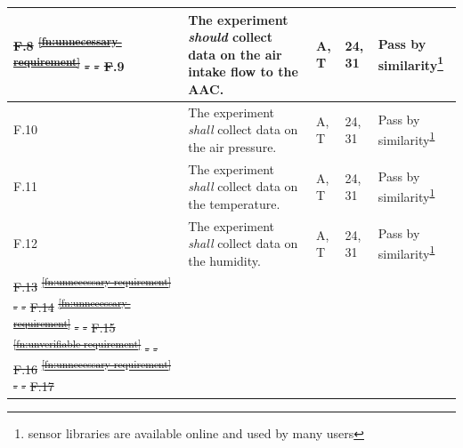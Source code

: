 \documentclass[a4paper,12pt,twoside]{article}
\providecommand{\DIFdeltex}[1]{{\protect\color{red}\sout{#1}}}                      %
\providecommand{\DIFdelbegin}{} %
\providecommand{\DIFdelend}{} %
\providecommand{\DIFdel}[1]{\texorpdfstring{\DIFdeltex{#1}}{}} %
\newcommand{\DIFscaledelfig}{0.5}
\newlength{\DIFdelgraphicswidth} %
\newlength{\DIFdelgraphicsheight} %
\newcommand{\DIFdelincludegraphics}[2][]{%
\sbox{\DIFdelgraphicsbox}{\DIFOincludegraphics[#1]{#2}}%
\settoboxwidth{\DIFdelgraphicswidth}{\DIFdelgraphicsbox} %
\settoboxtotalheight{\DIFdelgraphicsheight}{\DIFdelgraphicsbox} %
\scalebox{\DIFscaledelfig}{%
\parbox[b]{\DIFdelgraphicswidth}{\usebox{\DIFdelgraphicsbox}\\[-\baselineskip] \rule{\DIFdelgraphicswidth}{0em}}\llap{\resizebox{\DIFdelgraphicswidth}{\DIFdelgraphicsheight}{%
\setlength{\unitlength}{\DIFdelgraphicswidth}%
\begin{picture}(1,1)%
\thicklines\linethickness{2pt} %
{\color[rgb]{1,0,0}\put(0,0){\framebox(1,1){}}}%
{\color[rgb]{1,0,0}\put(0,0){\line( 1,1){1}}}%
{\color[rgb]{1,0,0}\put(0,1){\line(1,-1){1}}}%
\end{picture}%
}\hspace*{3pt}}} %
} %
\DeclareRobustCommand{\DIFdelbegin}{\DIFOdelbegin \let\includegraphics\DIFdelincludegraphics} %
\DeclareRobustCommand{\DIFdelend}{\DIFOaddend \let\includegraphics\DIFOincludegraphics} %
\begin{document}
\begin{longtable}[]{|m{}| m{} |m{} |m{}|m{}|}
\DIFdel{F.8  }%
\DIFdel{\textsuperscript{\ref{fn:unnecessary-requirement}}  }%
\DIFdel{- }%
\DIFdel{-}%
\DIFdel{F}\DIFdelend .9  & The experiment \textit{should} collect data on the air intake flow to the AAC. & A, T & 24, 31 & Pass by similarity\footnote{sensor libraries are available online and used by many users\label{fn:sensor-libraries}}\\ \hline
F.10 & The experiment \textit{shall} collect data on the air pressure. & A, T& 24, 31 & Pass by similarity\textsuperscript{\ref{fn:sensor-libraries}}\\ \hline
F.11 & The experiment \textit{shall} collect data on the temperature. &  A, T& 24, 31 & Pass by similarity\textsuperscript{\ref{fn:sensor-libraries}}\\ \hline
F.12 & The experiment \textit{shall} collect data on the humidity. & A, T & 24, 31  & Pass by similarity\textsuperscript{\ref{fn:sensor-libraries}}\\ \hline
\DIFdelbegin \DIFdel{F.13 }%
\DIFdel{\textsuperscript{\ref{fn:unnecessary-requirement}}}%
\DIFdel{- }%
\DIFdel{-}%
\DIFdel{F.14 }%
\DIFdel{\textsuperscript{\ref{fn:unnecessary-requirement}} }%
\DIFdel{-}%
\DIFdel{- }%
\DIFdel{F.15 }%
\DIFdel{\textsuperscript{\ref{fn:unverifiable-requirement}}}%
\DIFdel{- }%
\DIFdel{-}%
\DIFdel{F.16 }%
\DIFdel{\textsuperscript{\ref{fn:unnecessary-requirement}} }%
\DIFdel{- }%
\DIFdel{- }%
\DIFdel{F.17 }%

\end{longtable}
\end{document}
